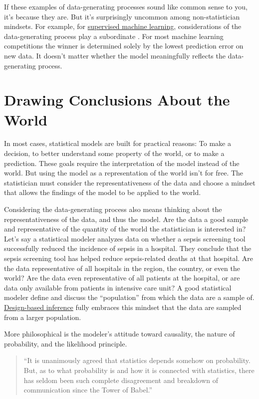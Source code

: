\documentclass[
  10pt,
]{scrbook}
\begin{document}
If these examples of data-generating processes sound like common sense to you, it's because they are.
But it's surprisingly uncommon among non-statistician mindsets.
For example, for \protect\hyperlink{supervised-ml}{supervised machine learning}, considerations of the data-generating process play a subordinate .
For most machine learning competitions the winner is determined solely by the lowest prediction error on new data.
It doesn't matter whether the model meaningfully reflects the data-generating process.

\hypertarget{drawing-conclusions-about-the-world}{%
\section{Drawing Conclusions About the World}\label{drawing-conclusions-about-the-world}}

In most cases, statistical models are built for practical reasons:
To make a decision, to better understand some property of the world, or to make a prediction.
These goals require the interpretation of the model instead of the world.
But using the model as a representation of the world isn't for free.
The statistician must consider the representativeness of the data and choose a mindset that allows the findings of the model to be applied to the world.

Considering the data-generating process also means thinking about the representativeness of the data, and thus the model.
Are the data a good sample and representative of the quantity of the world the statistician is interested in?
Let's say a statistical modeler analyzes data on whether a sepsis screening tool successfully reduced the incidence of sepsis in a hospital.
They conclude that the sepsis screening tool has helped reduce sepsis-related deaths at that hospital.
Are the data representative of all hospitals in the region, the country, or even the world?
Are the data even representative of all patients at the hospital, or are data only available from patients in intensive care unit?
A good statistical modeler define and discuss the ``population'' from which the data are a sample of.
\protect\hyperlink{design-based-inference}{Design-based inference} fully embraces this mindset that the data are sampled from a larger population.

More philosophical is the modeler's attitude toward causality, the nature of probability, and the likelihood principle.

\begin{quote}
``It is unanimously agreed that statistics depends somehow on probability. But, as to what probability is and how it is connected with statistics, there has seldom been such complete disagreement and breakdown of communication since the Tower of Babel.''
\end{quote}
\end{document}
